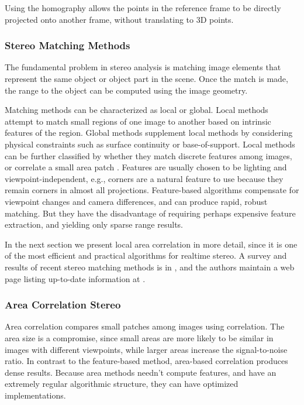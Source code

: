 \documentclass[twocolumn,oneside]{book}
\begin{document}
\noindent Using the homography allows the points
in the reference frame to be directly projected onto another frame,
without translating to 3D points.

\subsubsection{Stereo Matching Methods}

The fundamental problem in stereo analysis is matching image elements
that represent the same object or object part in the scene.  Once the
match is made, the range to the object can be computed using the image
geometry.

Matching methods can be characterized as local or global.  Local
methods attempt to match small regions of one image to another based
on intrinsic features of the region.  Global methods supplement local
methods by considering physical constraints such as surface continuity
or base-of-support.  Local methods can be further classified by
whether they match discrete features among images, or correlate a
small area patch \cite{barnard1982}.  Features are usually
chosen to be lighting and viewpoint-independent, e.g., corners are a
natural feature to use because they remain corners in almost all
projections.  Feature-based algorithms compensate for viewpoint
changes and camera differences, and can produce rapid, robust
matching. But they have the disadvantage of requiring perhaps
expensive feature extraction, and yielding only sparse range results.

In the next section we present local area correlation in more detail,
since it is one of the most efficient and practical algorithms for
realtime stereo.  A survey and results of recent stereo matching
methods is in \cite{scharstein02taxonomy}, and the authors maintain a
web page listing up-to-date information at \cite{middlebury}.


\subsubsection{Area Correlation Stereo} 

Area correlation compares small patches among images using
correlation.  The area size is a compromise, since small areas are
more likely to be similar in images with different viewpoints, while
larger areas increase the signal-to-noise ratio.  In contrast to the
feature-based method, area-based correlation produces dense results.
Because area methods needn't compute features, and have an extremely
regular algorithmic structure, they can have optimized
implementations.  
\end{document}
